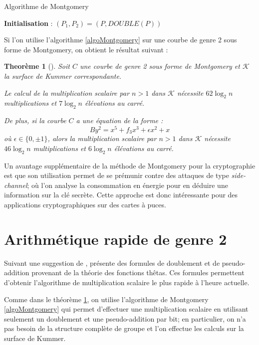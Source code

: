 \documentclass[a4paper]{article}
\newtheorem{theoreme}{Theorème}[section]
\theoremstyle{definition}
\theoremstyle{remark}
\numberwithin{equation}{section}
\begin{document}
\begin{algorithm}
\label{algoMontgomery}
\caption{Algorithme de Montgomery}
\textbf{Initialisation} : $(P_1,P_2) = (P,DOUBLE(P))$
\BlankLine
{}
\end{algorithm}

Si l'on utilise l'algorithme \ref{algoMontgomery} sur une courbe de genre 2 sous forme de Montgomery, on obtient le résultat suivant :
\begin{theoreme}[\citet{duquesne}]
\label{thduquesne}
Soit $C$ une courbe de genre 2 sous forme de Montgomery et $\mathcal{K}$ la surface de Kummer correspondante.

Le calcul de la multiplication scalaire par $n > 1$ dans $\mathcal{K}$ nécessite $62\log_2 n$ multiplications et $7\log_2 n$ élévations au carré.

De plus, si la courbe $C$ a une équation de la forme :
$$By^2 = x^5 + f_3 x^3 + \epsilon x^2 + x$$
où $\epsilon \in \{0,\pm 1\}$, alors la multiplication scalaire par $n > 1$ dans $\mathcal{K}$ nécessite $46\log_2 n$ multiplications et $6\log_2 n$ élévations au carré.
\end{theoreme}

Un avantage supplémentaire de la méthode de Montgomery pour la cryptographie est que son utilisation permet de se prémunir contre des attaques de type \emph{side-channel}; où l'on analyse la consommation en énergie pour en déduire une information sur la clé secrète. Cette approche est donc intéressante pour des applications cryptographiques sur des cartes à puces.

\section{Arithmétique rapide de genre 2}

Suivant une suggestion de \cite{chudnovsky}, \citep{gaudry} présente des formules de doublement et de pseudo-addition provenant de la théorie des fonctions thêtas. Ces formules permettent d'obtenir l'algorithme de multiplication scalaire le plus rapide à l'heure actuelle.

Comme dans le théorème \ref{thduquesne}, on utilise l'algorithme de Montgomery \ref{algoMontgomery} qui permet d'effectuer une multiplication scalaire en utilisant seulement un doublement et une pseudo-addition par bit; en particulier, on n'a pas besoin de la structure complète de groupe et l'on effectue les calculs sur la surface de Kummer.
\end{document}
